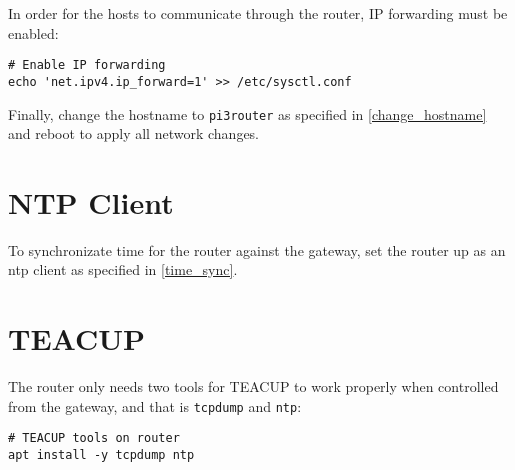 In order for the hosts to communicate through the router, IP forwarding must be enabled:

\begin{lstlisting}
# Enable IP forwarding
echo 'net.ipv4.ip_forward=1' >> /etc/sysctl.conf
\end{lstlisting}

Finally, change the hostname to \lstinline{pi3router} as specified in \ref{change_hostname} and reboot to apply all network changes.


\section{NTP Client}

To synchronizate time for the router against the gateway, set the router up as an \gls{ntp} client as specified in \ref{time_sync}.


\section{TEACUP}

The router only needs two tools for TEACUP to work properly when controlled from the gateway, and that is \lstinline{tcpdump} and \lstinline{ntp}:

\begin{lstlisting}
# TEACUP tools on router
apt install -y tcpdump ntp
\end{lstlisting}